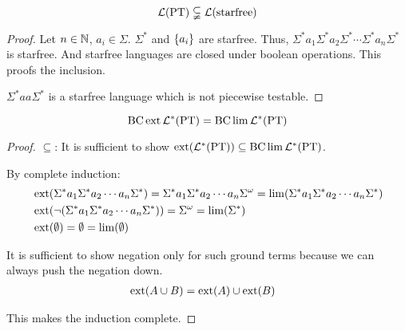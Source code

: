 \begin{lemma}
\[\mathcal{L}(\textup{\textrm{PT}}) \subsetneqq \mathcal{L}(\textup{\textrm{starfree}})\]
\begin{proof}
Let $n\in\mathbb{N}$, $a_i \in \Sigma$. $\Sigma^*$ and $\Set{a_i}$ are starfree. Thus, $\Sigma^* a_1 \Sigma^* a_2 \Sigma^* \cdots\Sigma^* a_n \Sigma^*$ is starfree. And starfree languages are closed under boolean operations. This proofs the inclusion.

$\Sigma^* aa \Sigma^*$ is a starfree language which is not piecewise testable.
\end{proof}
\end{lemma}


\begin{theorem}
\label{thm.PT}
\[ \operatorname{BC} \operatorname{ext} \mathcal{L}^* (\textup{\textrm{PT}}) = \operatorname{BC} \lim \mathcal{L}^* (\textup{\textrm{PT}}) \]
\begin{proof}
$\subseteq$: It is sufficient to show $\operatorname{ext}(\mathcal{L}^* (\textup{\textrm{PT}})) \subseteq \operatorname{BC} \lim \mathcal{L}^* (\textup{\textrm{PT}})$.

By complete induction:
\begin{align*}
& \operatorname{ext}(\Sigma^* a_1 \Sigma^* a_2 \dotsb a_n \Sigma^*) = \Sigma^* a_1 \Sigma^* a_2 \dotsb a_n \Sigma^\omega = \lim(\Sigma^* a_1 \Sigma^* a_2 \dotsb a_n \Sigma^*) \\
& \operatorname{ext}( \neg ( \Sigma^* a_1 \Sigma^* a_2 \dotsb a_n \Sigma^* )) = \Sigma^\omega = \lim( \Sigma^* ) \\
& \operatorname{ext}( \emptyset ) = \emptyset = \lim(\emptyset)
\end{align*}

It is sufficient to show negation only for such ground terms because we can always push the negation down.
\begin{align*}
& \operatorname{ext}(A \cup B) = \operatorname{ext}(A) \cup \operatorname{ext}(B)
\end{align*}

This makes the induction complete.


\end{proof}
\end{theorem}
